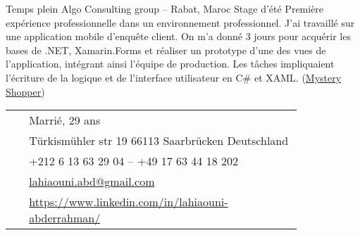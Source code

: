 \documentclass[10pt]{article} %
\begin{document}
\begin{paracol}{2}
\vspace{-\baselineskip}\medskip %

{Temps plein} %
{Algo Consulting group -- Rabat, Maroc} %
{Stage d'été } %
{Première expérience professionnelle dans un environnement professionnel. J'ai travaillé sur une application mobile d'enquête client. On m'a donné 3 jours pour acquérir les bases de .NET, Xamarin.Forms et réaliser un prototype d'une des vues de l'application, intégrant ainsi l'équipe de production. Les tâches impliquaient l'écriture de la logique et de l'interface utilisateur en C\# et XAML. (\href{https://www.royalairmaroc.com/us-en/mysterious-client}{Mystery Shopper})}  %


\vspace{-\baselineskip}\medskip %

\medskip %


\switchcolumn %


\parbox[top][0.10\textheight][c]{\linewidth}{ %
	\vspace{-0.05\textheight} %
	\colorbox{shade}{ %
		\begin{supertabular}{p{0.05\linewidth}|p{0.775\linewidth}} %
			\raisebox{-1pt}{\faUser} & Marrié, 29 ans\\ %
			\raisebox{-1pt}{\faHome} & Türkismühler str 19 66113 Saarbrücken Deutschland \\ %
			\raisebox{-1pt}{\faPhone} &  +212 6 13 63 29 04 -- +49 17 63 44 18 202 \\ %
			\raisebox{0pt}{\small\faEnvelope} & \href{mailto:lahiaouni.abd@gmail.com}{lahiaouni.abd@gmail.com} \\ %
			\raisebox{-1pt}{\faLinkedinSquare} & \href{https://www.linkedin.com/in/lahiaouni-abderrahman/}{https://www.linkedin.com/in/lahiaouni-abderrahman/} \\ %
		\end{supertabular}
	}
}


\end{paracol}
\end{document}
